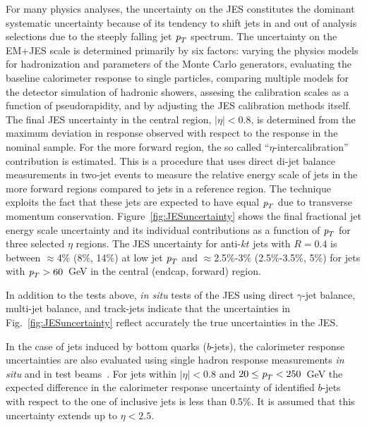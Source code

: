 \begin{itemize}
For many physics analyses, the uncertainty on the JES constitutes the dominant systematic uncertainty because of its tendency to shift jets in and out of analysis selections due to the steeply falling jet ${\emph{p}_{T}}$ spectrum. The uncertainty on the EM+JES scale  is determined primarily by six factors:  varying the physics models for hadronization and parameters of the Monte Carlo generators, evaluating the baseline calorimeter response to single particles, comparing multiple models for the detector simulation of hadronic showers, assesing the calibration scales as a function of pseudorapidity, and by adjusting the JES calibration methods itself.  The final JES uncertainty in the central region, $|\eta| < 0.8$, is determined from the maximum deviation in response observed with respect to the response in the nominal sample.  For the more forward region, the so called ``$\eta$-intercalibration'' contribution is estimated. This is a procedure that uses direct di-jet balance measurements in two-jet events to measure the relative energy scale of jets in the more forward regions compared to jets in a reference region. The technique exploits the fact that these jets are expected to have equal ${\emph{p}_{T}}$ due to transverse momentum conservation. Figure~\ref{fig:JESuncertainty}  shows the final fractional jet energy scale uncertainty and its individual contributions as a function of ${\emph{p}_{T}}$ for three selected $\eta$ regions. The JES uncertainty for anti-$kt$ jets with $R = 0.4$ is between $\approx$4\% (8\%, 14\%) at low jet ${\emph{p}_{T}}$ and $\approx$2.5\%-3\% (2.5\%-3.5\%, 5\%) for jets with ${\emph{p}_{T}} > 60$~GeV in the central (endcap, forward) region.

In addition to the tests above, \emph{in situ} tests of the JES using direct $\gamma$-jet balance, multi-jet balance, and track-jets indicate that the uncertainties in Fig.~\ref{fig:JESuncertainty} reflect accurately the true uncertainties in the JES.  

In the case of jets induced by bottom quarks ($b$-jets), the calorimeter response uncertainties are also evaluated using single hadron response measurements \emph{in situ}  and in test beams~\cite{ATLAS-CONF-2011-028}. For jets within $|\eta|<0.8$ and $20 \leq {\emph{p}_{T}} < 250$~GeV the expected difference in the calorimeter response uncertainty of identified $b$-jets with respect to the one of inclusive jets is less than 0.5\%. It is assumed that this uncertainty extends up to $\eta < 2.5$.


\end{itemize}
